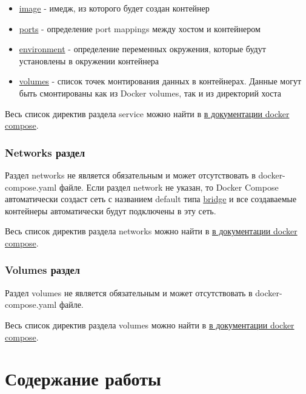 \documentclass[12pt,a4paper]{article}
\begin{document}
\begin{itemize}
    \item \href{https://docs.docker.com/reference/compose-file/services/#image}{image} - имедж, из которого будет создан контейнер
    \item \href{https://docs.docker.com/reference/compose-file/services/#ports}{ports} - определение port mappings между хостом и контейнером
    \item \href{https://docs.docker.com/reference/compose-file/services/#environment}{environment} - определение переменных окружения, которые будут установлены в окружении контейнера
    \item \href{https://docs.docker.com/reference/compose-file/services/#volumes}{volumes} - список точек монтирования данных в контейнерах. Данные могут быть смонтированы как из Docker volumes, так и из директорий хоста
\end{itemize}

Весь список директив раздела service можно найти в \href{https://docs.docker.com/reference/compose-file/services/}{в документации docker compose}.

\subsubsection{Networks раздел}
Раздел networks не является обязательным и может отсутствовать в docker-compose.yaml файле. Если раздел network не указан, то
Docker Compose автоматически создаст сеть с названием default типа \href{https://docs.docker.com/engine/network/drivers/}{bridge}
и все создаваемые контейнеры автоматически будут подключены в эту сеть.

Весь список директив раздела networks можно найти в \href{https://docs.docker.com/reference/compose-file/networks/#attributes}{в документации docker compose}.

\subsubsection{Volumes раздел}
Раздел volumes не является обязательным и может отсутствовать в docker-compose.yaml файле.

Весь список директив раздела volumes можно найти в \href{https://docs.docker.com/reference/compose-file/volumes/}{в документации docker compose}.

\section{Содержание работы}
\end{document}
